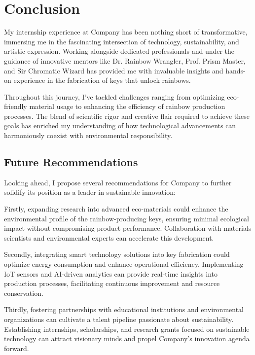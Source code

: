\chapter{Conclusion}
\label{ch: conclusion}

My internship experience at Company has been nothing short of transformative, immersing me in the fascinating intersection of technology, sustainability, and artistic expression. Working alongside dedicated professionals and under the guidance of innovative mentors like Dr. Rainbow Wrangler, Prof. Prism Master, and Sir Chromatic Wizard has provided me with invaluable insights and hands-on experience in the fabrication of keys that unlock rainbows.

Throughout this journey, I've tackled challenges ranging from optimizing eco-friendly material usage to enhancing the efficiency of rainbow production processes. The blend of scientific rigor and creative flair required to achieve these goals has enriched my understanding of how technological advancements can harmoniously coexist with environmental responsibility.

\section{Future Recommendations}

Looking ahead, I propose several recommendations for Company to further solidify its position as a leader in sustainable innovation:
  
Firstly, expanding research into advanced eco-materials could enhance the environmental profile of the rainbow-producing keys, ensuring minimal ecological impact without compromising product performance. Collaboration with materials scientists and environmental experts can accelerate this development.

Secondly, integrating smart technology solutions into key fabrication could optimize energy consumption and enhance operational efficiency. Implementing IoT sensors and AI-driven analytics can provide real-time insights into production processes, facilitating continuous improvement and resource conservation.

Thirdly, fostering partnerships with educational institutions and environmental organizations can cultivate a talent pipeline passionate about sustainability. Establishing internships, scholarships, and research grants focused on sustainable technology can attract visionary minds and propel Company’s innovation agenda forward.

